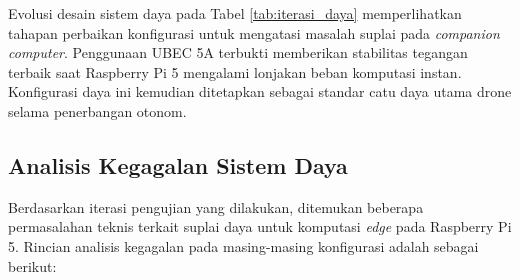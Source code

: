 Evolusi desain sistem daya pada Tabel \ref{tab:iterasi_daya} memperlihatkan tahapan perbaikan konfigurasi untuk mengatasi masalah suplai pada \textit{companion computer}. Penggunaan UBEC 5A terbukti memberikan stabilitas tegangan terbaik saat Raspberry Pi 5 mengalami lonjakan beban komputasi instan. Konfigurasi daya ini kemudian ditetapkan sebagai standar catu daya utama drone selama penerbangan otonom.

\subsection{Analisis Kegagalan Sistem Daya}

Berdasarkan iterasi pengujian yang dilakukan, ditemukan beberapa permasalahan teknis terkait suplai daya untuk komputasi \textit{edge} pada Raspberry Pi 5. Rincian analisis kegagalan pada masing-masing konfigurasi adalah sebagai berikut:

